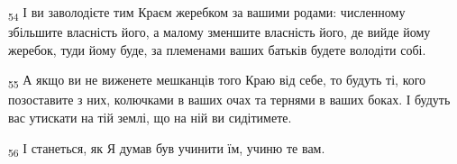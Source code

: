 \begin{tcolorbox}
\textsubscript{54} І ви заволодієте тим Краєм жеребком за вашими родами: численному збільшите власність його, а малому зменшите власність його, де вийде йому жеребок, туди йому буде, за племенами ваших батьків будете володіти собі.
\end{tcolorbox}
\begin{tcolorbox}
\textsubscript{55} А якщо ви не виженете мешканців того Краю від себе, то будуть ті, кого позоставите з них, колючками в ваших очах та тернями в ваших боках. І будуть вас утискати на тій землі, що на ній ви сидітимете.
\end{tcolorbox}
\begin{tcolorbox}
\textsubscript{56} І станеться, як Я думав був учинити їм, учиню те вам.
\end{tcolorbox}
